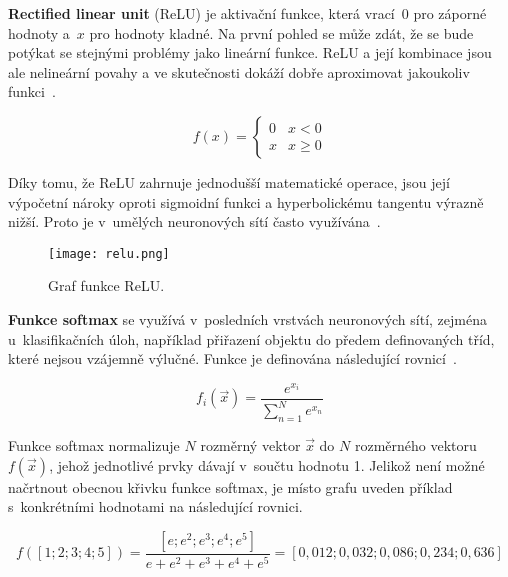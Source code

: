 \textbf{Rectified linear unit} (ReLU) je aktivační funkce, která vrací~$0$ pro záporné hodnoty a~$x$ pro hodnoty kladné. Na první pohled se může zdát, že se bude potýkat se stejnými problémy jako lineární funkce. ReLU a její kombinace jsou ale nelineární povahy a ve skutečnosti dokáží dobře aproximovat jakoukoliv funkci~\cite{mediumActivationFunctions}.

\begin{equation}
    f(x)=\left\{\begin{matrix}
        0 & x < 0  \\
        x & x \geq 0
    \end{matrix}\right.
\end{equation}

Díky tomu, že ReLU zahrnuje jednodušší matematické operace, jsou její výpočetní nároky oproti sigmoidní funkci a hyperbolickému tangentu výrazně nižší. Proto je v~umělých neuronových sítí často využívána~\cite{articleNeuralNetworksOverview}.

\begin{figure}[H]
    \centering
    \texttt{[image: relu.png]}
    \caption[Graf funkce ReLU]{Graf funkce ReLU.}
    \label{fig_relu}
\end{figure}


\textbf{Funkce softmax} se využívá v~posledních vrstvách neuronových sítí, zejména u~klasifikačních úloh, například přiřazení objektu do předem definovaných tříd, které nejsou vzájemně výlučné. Funkce je definována následující rovnicí~\cite{mediumActivationFunctions}.

\begin{equation}
    f_i(\vec{x})=\frac{e^{x_i}}{\sum^N_{n=1} e^{x_n}}
\end{equation}

Funkce softmax normalizuje $N$ rozměrný vektor $\vec{x}$ do $N$ rozměrného vektoru $f(\vec{x})$, jehož jednotlivé prvky dávají v~součtu hodnotu 1. Jelikož není možné načrtnout obecnou křivku funkce softmax, je místo grafu uveden příklad s~konkrétními hodnotami na následující rovnici.

\begin{equation}
    f([1; 2; 3; 4; 5])=\frac{[e; e^2; e^3; e^4; e^5]}{e+e^2+e^3+e^4+e^5} = [0,012; 0,032; 0,086; 0,234; 0,636]
    \label{eq_softmax_example}
\end{equation}



